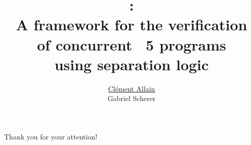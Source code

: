 \documentclass[aspectratio=169, xcolor=dvipsnames]{beamer}
\title{
  \Zoo: \\
  A framework for the verification \\
  of concurrent \OCaml~5 programs \\
  using separation logic
}
\author{
  \underline{Clément Allain} \\
  Gabriel Scherer
}
\begin{document}

\begin{frame}
\titlepage
\end{frame}











\begin{frame}
\centering
\huge
Thank you for your attention!
\end{frame}

\end{document}
